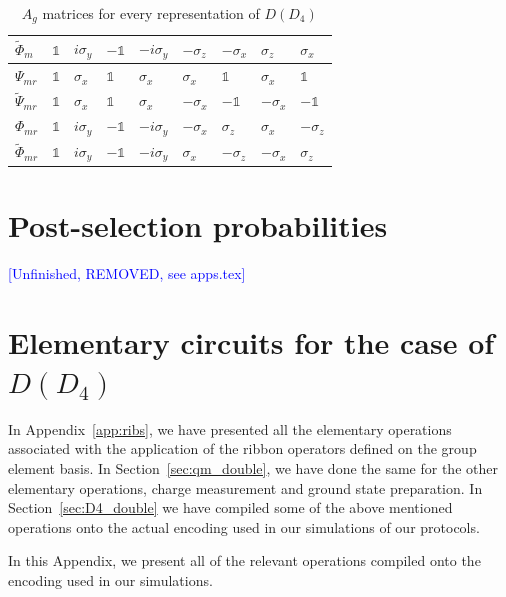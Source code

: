\documentclass[two column]{article}
\newcommand{\jovan}[1]{\textcolor{blue}{[#1]}}
\begin{document}
\begin{table}[]
\begin{tabular}{|l||l|l|l|l|l|l|l|l|}
 $\tilde{\Phi}_{m}$ &$\mathbb{1}$&$i\sigma_y$ &$-\mathbb{1}$& $-i\sigma_y$ &$-\sigma_z$ &$-\sigma_x$ &  $\sigma_z$ &   $\sigma_x$ \\\hline
$\Psi_{mr}$ &$\mathbb{1}$&  $\sigma_x$ & $\mathbb{1}$&  $\sigma_x$ & $\sigma_x$ & $\mathbb{1}$&  $\sigma_x$ &   $\mathbb{1}$\\\hline
$\tilde{\Psi}_{mr}$ &$\mathbb{1}$&  $\sigma_x$ & $\mathbb{1}$&  $\sigma_x$ &$-\sigma_x$ &$-\mathbb{1}$& $-\sigma_x$ &  $-\mathbb{1}$\\\hline
$\Phi_{mr}$ &$\mathbb{1}$&$i\sigma_y$ &$-\mathbb{1}$& $-i\sigma_y$ &$-\sigma_x$ & $\sigma_z$ &  $\sigma_x$ &  $-\sigma_z$ \\\hline
$\tilde{\Phi}_{mr}$ &$\mathbb{1}$&$i\sigma_y$ &$-\mathbb{1}$& $-i\sigma_y$ & $\sigma_x$ &$-\sigma_z$ & $-\sigma_x$ &   $\sigma_z$ \\\hline
\end{tabular}
    \caption{$A_g$ matrices for every representation of $D(D_4)$}
    \label{tab:reps}
\end{table}



\section{Post-selection probabilities}\label{app:postsel}
\jovan{Unfinished, REMOVED, see apps.tex}

\section{Elementary circuits for the case of $D(D_4)$}\label{app:cirqs}

In Appendix~\ref{app:ribs}, we have presented all the elementary operations associated with the application of the ribbon operators defined on the group element basis.
In Section~\ref{sec:qm_double}, we have done the same for the other elementary operations, charge measurement and ground state preparation.
In Section~\ref{sec:D4_double} we have compiled some of the above mentioned operations onto the actual encoding used in our simulations of our protocols.

In this Appendix, we present all of the relevant operations compiled onto the encoding used in our simulations.
\end{document}
